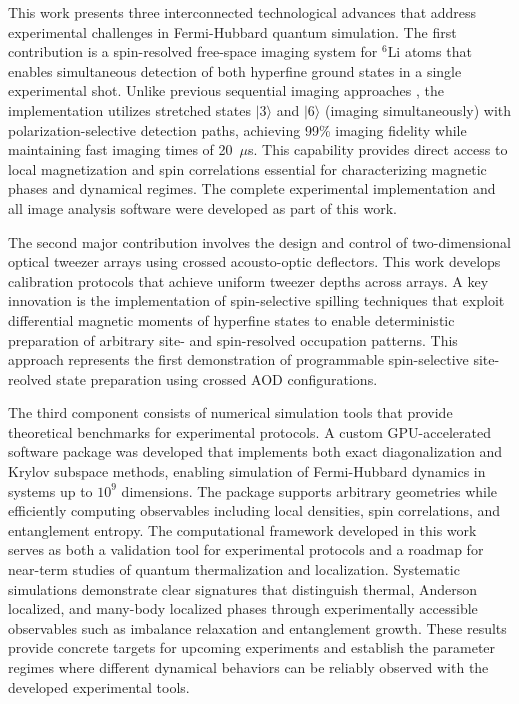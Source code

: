
This work presents three interconnected technological advances that address experimental challenges in Fermi-Hubbard quantum simulation. The first contribution is a spin-resolved free-space imaging system for $^6$Li atoms that enables simultaneous detection of both hyperfine ground states in a single experimental shot. Unlike previous sequential imaging approaches \cite{bergschneider_spin-resolved_2018}, the implementation utilizes stretched states $|3\rangle$ and $|6\rangle$ (imaging simultaneously) with polarization-selective detection paths, achieving 99\% imaging fidelity while maintaining fast imaging times of 20~$\mu$s. This capability provides direct access to local magnetization and spin correlations essential for characterizing magnetic phases and dynamical regimes. The complete experimental implementation and all image analysis software were developed as part of this work.

The second major contribution involves the design and control of two-dimensional optical tweezer arrays using crossed acousto-optic deflectors. This work develops calibration protocols that achieve uniform tweezer depths across arrays. A key innovation is the implementation of spin-selective spilling techniques that exploit differential magnetic moments of hyperfine states to enable deterministic preparation of arbitrary site- and spin-resolved occupation patterns. This approach represents the first demonstration of programmable spin-selective site-reolved state preparation using crossed AOD configurations.

The third component consists of numerical simulation tools that provide theoretical benchmarks for experimental protocols. A custom GPU-accelerated software package was developed that implements both exact diagonalization and Krylov subspace methods, enabling simulation of Fermi-Hubbard dynamics in systems up to $10^9$ dimensions. The package supports arbitrary geometries while efficiently computing observables including local densities, spin correlations, and entanglement entropy.
The computational framework developed in this work serves as both a validation tool for experimental protocols and a roadmap for near-term studies of quantum thermalization and localization. Systematic simulations demonstrate clear signatures that distinguish thermal, Anderson localized, and many-body localized phases through experimentally accessible observables such as imbalance relaxation and entanglement growth. These results provide concrete targets for upcoming experiments and establish the parameter regimes where different dynamical behaviors can be reliably observed with the developed experimental tools.

